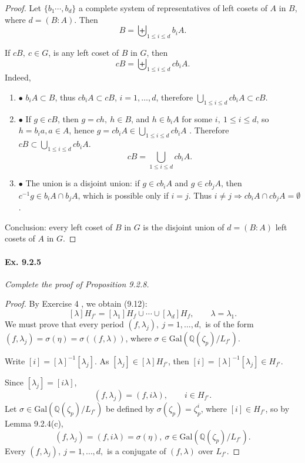 \documentclass[11pt,a4paper]{article}
\newcommand{\be} {\begin{enumerate}}
\newcommand{\ee} {\end{enumerate}}
\newcommand{\Q}{\mathbb{Q}}
\newcommand{\Gal}{\mathrm{Gal}}
\begin{document}
\begin{proof}
Let $\{b_1\cdots,b_d\}$ a complete system of representatives of left cosets of $A$ in $B$, where $d=(B:A)$. Then
$$B = \biguplus_{1\leq i \leq d} b_i A.$$

If $cB,\ c\in G$, is any left coset of $B$ in $G$, then
$$cB = \biguplus_{1\leq i \leq d} c b_i A.$$
Indeed, 
\be
\item[$\bullet$] $b_i A \subset B$, thus $cb_iA \subset cB$, $i=1,\ldots,d$, therefore $\bigcup_{1\leq i \leq d} c b_i A \subset cB$.

\item[$\bullet$] If $g \in cB$, then $g = ch,\ h\in B$, and $h \in  b_i A$ for some $i, \ 1\leq i \leq d$, so $h= b_ia, a\in A$, hence $g = cb_i A \in \bigcup_{1\leq i \leq d} c b_i A$ . Therefore $cB \subset \bigcup_{1\leq i \leq d} c b_i A$.
$$cB = \bigcup_{1\leq i \leq d} c b_i A.$$
\item[$\bullet$] The union is a disjoint union: if $g \in cb_iA$ and $g\in cb_jA$, then $c^{-1}g \in b_iA\cap b_jA$, which is possible only if $i=j$. Thus $i\neq j \Rightarrow cb_iA\cap cb_jA = \emptyset$.
\ee
Conclusion: every left coset of $B$ in $G$ is the disjoint union of $d = (B:A)$ left cosets of $A$ in $G$.
\end{proof}

\paragraph{Ex. 9.2.5}

{\it Complete the proof of Proposition 9.2.8.
}

\begin{proof}

By Exercise 4 , we obtain (9.12):
$$[\lambda]H_{f'} = [\lambda_1]H_f\cup\cdots \cup[\lambda_d]H_f, \qquad \lambda = \lambda_1.$$
We must prove that every period $(f,\lambda_j),\ j=1,\ldots,d,$ is of the form  $(f,\lambda_j) = \sigma(\eta) = \sigma((f,\lambda))$, where $\sigma \in \Gal(\Q(\zeta_p)/L_{f'})$.

Write $[i] = [\lambda]^{-1} [\lambda_j]$.  As  $[\lambda_j]\in [\lambda] H_{f'}$, then  $[i] = [\lambda]^{-1} [\lambda_j ]\in H_{f'}$. 

Since $[\lambda_j ]= [ i \lambda] $,
 $$(f,\lambda_j) = (f,i\lambda), \qquad i\in H_{f'}.$$ 
Let $\sigma \in \Gal(\Q(\zeta_p)/L_{f'})$ be defined by $\sigma(\zeta_p) = \zeta_p^i$, where $ [i] \in H_{f'}$, so by Lemma 9.2.4(c),
$$(f,\lambda_j) = (f,i\lambda) = \sigma(\eta),\ \sigma \in  \Gal(\Q(\zeta_p)/L_{f'}).$$
Every $(f,\lambda_j),\ j=1,\ldots,d,$ is a conjugate of $(f,\lambda)$ over $L_{f'}$.
\end{proof}
\end{document}
